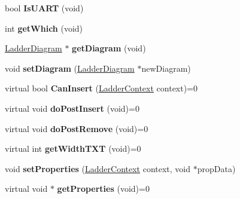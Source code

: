 \begin{DoxyCompactItemize}
\item 
\hypertarget{class_ladder_elem_aa582b254dac1c5846ed3a36e8de467ef}{bool {\bfseries Is\-U\-A\-R\-T} (void)}\label{class_ladder_elem_aa582b254dac1c5846ed3a36e8de467ef}

\item 
\hypertarget{class_ladder_elem_a110042ee8c22a1de7c882ad24ac0ef3c}{int {\bfseries get\-Which} (void)}\label{class_ladder_elem_a110042ee8c22a1de7c882ad24ac0ef3c}

\item 
\hypertarget{class_ladder_elem_abcac57389e52a25a1701f36a8d8734bf}{\hyperlink{class_ladder_diagram}{Ladder\-Diagram} $\ast$ {\bfseries get\-Diagram} (void)}\label{class_ladder_elem_abcac57389e52a25a1701f36a8d8734bf}

\item 
\hypertarget{class_ladder_elem_a55c140c849baadb2405afec5edf99412}{void {\bfseries set\-Diagram} (\hyperlink{class_ladder_diagram}{Ladder\-Diagram} $\ast$new\-Diagram)}\label{class_ladder_elem_a55c140c849baadb2405afec5edf99412}

\item 
\hypertarget{class_ladder_elem_a5ed7127003bc4bff193de746d6a3e85c}{virtual bool {\bfseries Can\-Insert} (\hyperlink{struct_ladder_context}{Ladder\-Context} context)=0}\label{class_ladder_elem_a5ed7127003bc4bff193de746d6a3e85c}

\item 
\hypertarget{class_ladder_elem_a2a670f63e40604bc86f55ff708a05603}{virtual void {\bfseries do\-Post\-Insert} (void)=0}\label{class_ladder_elem_a2a670f63e40604bc86f55ff708a05603}

\item 
\hypertarget{class_ladder_elem_a1b30da331f1638d23e3860f08d7dac69}{virtual void {\bfseries do\-Post\-Remove} (void)=0}\label{class_ladder_elem_a1b30da331f1638d23e3860f08d7dac69}

\item 
\hypertarget{class_ladder_elem_a947f2c620ff0e47d42c4e07ae1a60f64}{virtual int {\bfseries get\-Width\-T\-X\-T} (void)=0}\label{class_ladder_elem_a947f2c620ff0e47d42c4e07ae1a60f64}

\item 
\hypertarget{class_ladder_elem_a7ac5007e4cdf921b401f287fe0a967ab}{void {\bfseries set\-Properties} (\hyperlink{struct_ladder_context}{Ladder\-Context} context, void $\ast$prop\-Data)}\label{class_ladder_elem_a7ac5007e4cdf921b401f287fe0a967ab}

\item 
\hypertarget{class_ladder_elem_aa849dd21010eb6f6e46e18ef6560c556}{virtual void $\ast$ {\bfseries get\-Properties} (void)=0}\label{class_ladder_elem_aa849dd21010eb6f6e46e18ef6560c556}


\end{DoxyCompactItemize}
